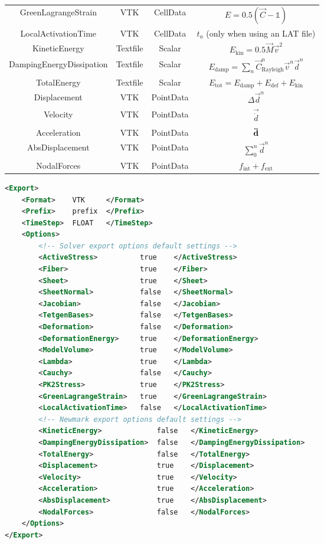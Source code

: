 \begin{table}[h!]
\begin{tabular}{cccc}
       GreenLagrangeStrain & VTK & CellData & $E =0.5 (\vec C - \mathds{1})$\\
       LocalActivationTime & VTK & CellData  & $t_a$ (only when using an LAT file)\\
       KineticEnergy & Textfile & Scalar  & $E_\mathrm{kin} = 0.5 \vec M \vec v^2$\\
       DampingEnergyDissipation & Textfile & Scalar & $E_\mathrm{damp} = \sum_n \vec C_\mathrm{Rayleigh}^n \vec v^n \vec d^n$ \\
       TotalEnergy & Textfile & Scalar  & $E_\mathrm{tot} = E_\mathrm{damp} + E_\mathrm{def} + E_\mathrm{kin}$\\
       Displacement & VTK & PointData  & $\Delta \vec d^n$\\
       Velocity & VTK & PointData  & $\vec{\dot{d}}$\\
       Acceleration & VTK & PointData  & $\vec{\Ddot{d}}$\\
       AbsDisplacement & VTK & PointData  & $\sum^n_{0} \vec d^n$\\
       NodalForces & VTK & PointData  & $f_\mathrm{int}+f_\mathrm{ext}$\\
         \bottomrule
    \end{tabular}
\end{table}

\begin{lstlisting}[language=XML,caption=.xml settings for data export options.]
<Export>
    <Format>	VTK 	</Format>
    <Prefix> 	prefix	</Prefix>
    <TimeStep> 	FLOAT	</TimeStep>
    <Options>
    	<!-- Solver export options default settings -->
    	<ActiveStress> 			true 	</ActiveStress>
    	<Fiber> 				true 	</Fiber>
    	<Sheet>					true 	</Sheet>
    	<SheetNormal>			false	</SheetNormal>
    	<Jacobian>				false	</Jacobian>
    	<TetgenBases>			false	</TetgenBases>
        <Deformation>			false	</Deformation>
        <DeformationEnergy>		true	</DeformationEnergy>
        <ModelVolume>           true    </ModelVolume>
    	<Lambda>				true	</Lambda>
    	<Cauchy>				false	</Cauchy>
    	<PK2Stress>				true	</PK2Stress>
    	<GreenLagrangeStrain> 	true 	</GreenLagrangeStrain>
    	<LocalActivationTime>	false	</LocalActivationTime>
    	<!-- Newmark export options default settings -->
    	<KineticEnergy>				false	</KineticEnergy>
    	<DampingEnergyDissipation> 	false 	</DampingEnergyDissipation>
    	<TotalEnergy>				false	</TotalEnergy>
    	<Displacement>				true	</Displacement>
    	<Velocity>					true	</Velocity>
    	<Acceleration>				true	</Acceleration>
    	<AbsDisplacement>			true	</AbsDisplacement>
    	<NodalForces>				false	</NodalForces>
    </Options>
</Export>
\end{lstlisting}
